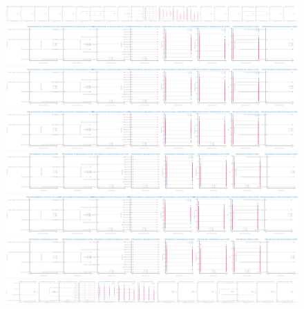 \documentclass[10pt]{extarticle}
\begin{document}
\begin{figure}[H]
\includegraphics[scale=0.05]{images/dataset1/data_profiling/CovidPos_sparsity_HadDiabetes_per_class.png}
\includegraphics[scale=0.05]{images/dataset1/data_profiling/CovidPos_sparsity_DeafOrHardOfHearing_per_class.png}
\includegraphics[scale=0.05]{images/dataset1/data_profiling/CovidPos_sparsity_BlindOrVisionDifficulty_per_class.png}
\includegraphics[scale=0.05]{images/dataset1/data_profiling/CovidPos_sparsity_DifficultyConcentrating_per_class.png}
\includegraphics[scale=0.05]{images/dataset1/data_profiling/CovidPos_sparsity_DifficultyWalking_per_class.png}
\includegraphics[scale=0.05]{images/dataset1/data_profiling/CovidPos_sparsity_DifficultyDressingBathing_per_class.png}
\includegraphics[scale=0.05]{images/dataset1/data_profiling/CovidPos_sparsity_DifficultyErrands_per_class.png}
\includegraphics[scale=0.05]{images/dataset1/data_profiling/CovidPos_sparsity_SmokerStatus_per_class.png}

\end{figure}
\end{document}

